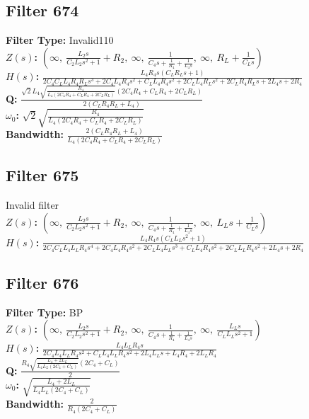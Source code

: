 \documentclass{article}
\begin{document}
\subsection*{Filter 674}
\textbf{Filter Type:} Invalid110 \\ 
\textbf{$Z(s)$:} $\left( \infty, \  \frac{L_{2} s}{C_{2} L_{2} s^{2} + 1} + R_{2}, \  \infty, \  \frac{1}{C_{4} s + \frac{1}{R_{4}} + \frac{1}{L_{4} s}}, \  \infty, \  R_{L} + \frac{1}{C_{L} s}\right)$ \\ 
\textbf{$H(s)$:} $\frac{L_{4} R_{4} s \left(C_{L} R_{L} s + 1\right)}{2 C_{4} C_{L} L_{4} R_{4} R_{L} s^{3} + 2 C_{4} L_{4} R_{4} s^{2} + C_{L} L_{4} R_{4} s^{2} + 2 C_{L} L_{4} R_{L} s^{2} + 2 C_{L} R_{4} R_{L} s + 2 L_{4} s + 2 R_{4}}$ \\ 
\textbf{Q:} $\frac{\sqrt{2} L_{4} \sqrt{\frac{R_{4}}{L_{4} \left(2 C_{4} R_{4} + C_{L} R_{4} + 2 C_{L} R_{L}\right)}} \left(2 C_{4} R_{4} + C_{L} R_{4} + 2 C_{L} R_{L}\right)}{2 \left(C_{L} R_{4} R_{L} + L_{4}\right)}$ \\ 
\textbf{$\omega_0$:} $\sqrt{2} \sqrt{\frac{R_{4}}{L_{4} \left(2 C_{4} R_{4} + C_{L} R_{4} + 2 C_{L} R_{L}\right)}}$ \\ 
\textbf{Bandwidth:} $\frac{2 \left(C_{L} R_{4} R_{L} + L_{4}\right)}{L_{4} \left(2 C_{4} R_{4} + C_{L} R_{4} + 2 C_{L} R_{L}\right)}$ \\ 
\subsection*{Filter 675}
Invalid filter \\ 
\textbf{$Z(s)$:} $\left( \infty, \  \frac{L_{2} s}{C_{2} L_{2} s^{2} + 1} + R_{2}, \  \infty, \  \frac{1}{C_{4} s + \frac{1}{R_{4}} + \frac{1}{L_{4} s}}, \  \infty, \  L_{L} s + \frac{1}{C_{L} s}\right)$ \\ 
\textbf{$H(s)$:} $\frac{L_{4} R_{4} s \left(C_{L} L_{L} s^{2} + 1\right)}{2 C_{4} C_{L} L_{4} L_{L} R_{4} s^{4} + 2 C_{4} L_{4} R_{4} s^{2} + 2 C_{L} L_{4} L_{L} s^{3} + C_{L} L_{4} R_{4} s^{2} + 2 C_{L} L_{L} R_{4} s^{2} + 2 L_{4} s + 2 R_{4}}$ \\ 
\subsection*{Filter 676}
\textbf{Filter Type:} BP \\ 
\textbf{$Z(s)$:} $\left( \infty, \  \frac{L_{2} s}{C_{2} L_{2} s^{2} + 1} + R_{2}, \  \infty, \  \frac{1}{C_{4} s + \frac{1}{R_{4}} + \frac{1}{L_{4} s}}, \  \infty, \  \frac{L_{L} s}{C_{L} L_{L} s^{2} + 1}\right)$ \\ 
\textbf{$H(s)$:} $\frac{L_{4} L_{L} R_{4} s}{2 C_{4} L_{4} L_{L} R_{4} s^{2} + C_{L} L_{4} L_{L} R_{4} s^{2} + 2 L_{4} L_{L} s + L_{4} R_{4} + 2 L_{L} R_{4}}$ \\ 
\textbf{Q:} $\frac{R_{4} \sqrt{\frac{L_{4} + 2 L_{L}}{L_{4} L_{L} \left(2 C_{4} + C_{L}\right)}} \left(2 C_{4} + C_{L}\right)}{2}$ \\ 
\textbf{$\omega_0$:} $\sqrt{\frac{L_{4} + 2 L_{L}}{L_{4} L_{L} \left(2 C_{4} + C_{L}\right)}}$ \\ 
\textbf{Bandwidth:} $\frac{2}{R_{4} \left(2 C_{4} + C_{L}\right)}$ \\ 
\end{document}
